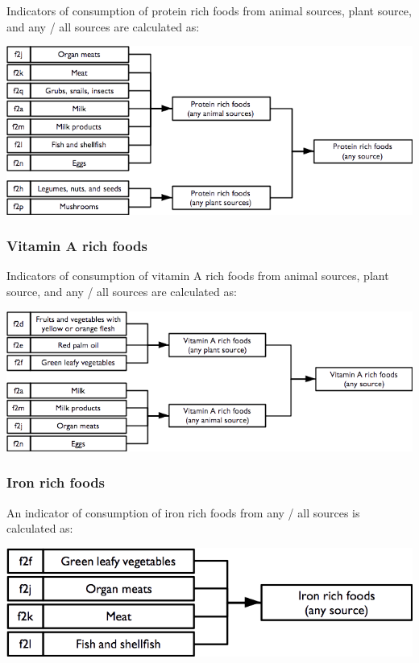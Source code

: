 \documentclass[12pt,a4paper]{book}
\theoremstyle{definition}
\theoremstyle{definition}
\theoremstyle{definition}
\theoremstyle{remark}
\begin{document}
Indicators of consumption of protein rich foods from animal sources,
plant source, and any / all sources are calculated as:

\begin{center}\includegraphics[width=9.76in]{figures/indicators09} \end{center}

\hypertarget{vitamin-a-rich-foods}{%
\subsubsection{Vitamin A rich foods}\label{vitamin-a-rich-foods}}

Indicators of consumption of vitamin A rich foods from animal sources,
plant source, and any / all sources are calculated as:

\begin{center}\includegraphics[width=9.76in]{figures/indicators10} \end{center}

\newpage

\hypertarget{iron-rich-foods}{%
\subsubsection{Iron rich foods}\label{iron-rich-foods}}

An indicator of consumption of iron rich foods from any / all sources is
calculated as:

\begin{center}\includegraphics[width=9.76in]{figures/indicators11} \end{center}
\end{document}
